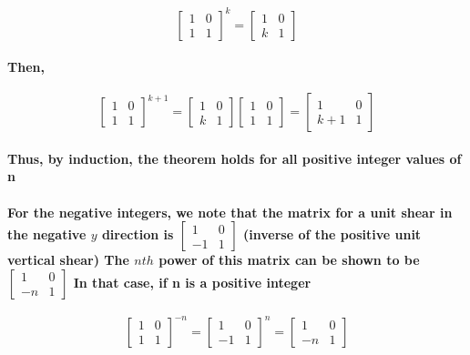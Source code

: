 \documentclass{report}
\begin{document}
\begin{equation}
\begin{bmatrix}
1&0\\1&1
\end{bmatrix}^k
=
\begin{bmatrix}
1&0\\k&1
\end{bmatrix}
\end{equation}

\paragraph{Then,}

\begin{equation}
\begin{bmatrix}
1&0\\1&1
\end{bmatrix}^{k+1}
=
\begin{bmatrix}
1&0\\k&1
\end{bmatrix}
\begin{bmatrix}
1&0\\1&1
\end{bmatrix}
=
\begin{bmatrix}
1&0\\k+1&1
\end{bmatrix}
\end{equation}

\paragraph{Thus, by induction, the theorem holds for all positive integer values of n}

\paragraph{For the negative integers, we note that the matrix for a unit shear in the negative $y$ direction is 
$\begin{bmatrix}
1&0\\-1&1
\end{bmatrix}$
(inverse of the positive unit vertical shear) The $nth$ power of this matrix can be shown to be 
$\begin{bmatrix}
1&0\\-n&1
\end{bmatrix}$
In that case, if n is a positive integer}

\begin{equation}
\begin{bmatrix}
1&0\\1&1
\end{bmatrix}^{-n}
=
\begin{bmatrix}
1&0\\-1&1
\end{bmatrix}^n
=
\begin{bmatrix}
1&0\\-n&1
\end{bmatrix}
\end{equation}
\end{document}
